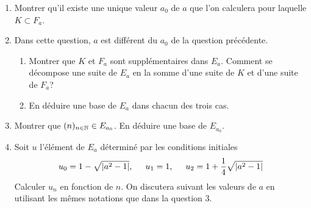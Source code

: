 \begin{enumerate}
  \item Montrer qu'il existe une unique valeur $a_0$ de $a$ que l'on calculera pour laquelle $K\subset F_a$.

  \item Dans cette question, $a$ est différent du $a_0$ de la question précédente.
\begin{enumerate}
     \item Montrer que $K$ et $F_a$ sont supplémentaires dans $E_a$. Comment se décompose une suite de $E_a$ en la somme d'une suite de $K$ et d'une suite de $F_a$?
     \item En d{\'e}duire une base de $E_a$ dans chacun des trois cas.
   \end{enumerate}

 \item Montrer que $(n)_{n\in\mathbb{N}} \in E_{a_0}$. En d{\'e}duire une base de $E_{a_0}$.

 \item Soit $u$ l'{\'e}l{\'e}ment de $E_a$ d{\'e}termin{\'e} par les conditions initiales
\begin{displaymath}
 u_0=1-\sqrt{|a^2-1|}, \hspace{0.5cm} u_1 = 1 , \hspace{0.5cm} u_2 = 1+\frac{1}{4}\sqrt{|a^2-1|}
\end{displaymath}
 Calculer $u_n$ en fonction de $n$. On discutera suivant les valeurs de $a$ en utilisant les mêmes notations que dans la question 3.
\end{enumerate}
